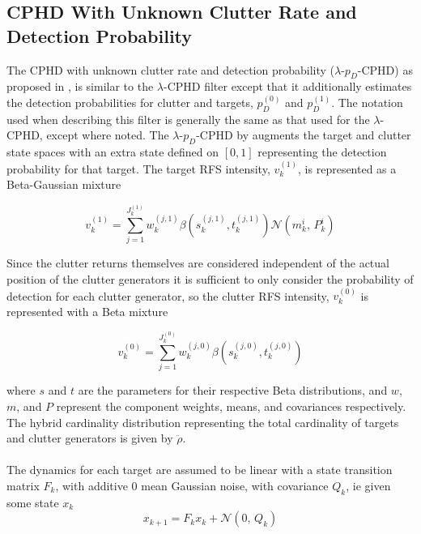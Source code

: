 \documentclass{article}
\newcommand{\clut}{{(0)}}
\newcommand{\tgt}{{(1)}}
\begin{document}
\subsection{CPHD With Unknown Clutter Rate and Detection Probability}
The CPHD with unknown clutter rate and detection probability ($\lambda$-$p_D$-CPHD) as proposed in \cite{cphd}, is similar to the $\lambda$-CPHD filter except that it additionally estimates the detection probabilities for clutter and targets, $p_D^{(0)}$ and $p_D^{(1)}$. The notation used when describing this filter is generally the same as that used for the $\lambda$-CPHD, except where noted. The $\lambda$-$p_D$-CPHD by augments the target and clutter state spaces with an extra state defined on $[0, 1]$ representing the detection probability for that target. The target RFS intensity, $v_k^{(1)}$, is represented as a Beta-Gaussian mixture

\begin{equation}
  \label{eq:v1_bm}
  v_k^\tgt = \sum_{j=1}^{J^\tgt _k}w_k^{(j,1)} \beta(s_k^{(j, 1)}, t_k^{(j, 1)})\mathcal{N}(m_k^i,\,P_k^i)
\end{equation}

Since the clutter returns themselves are considered independent of the actual position of the clutter generators it is sufficient to only consider the probability of detection for each clutter generator, so the clutter RFS intensity, $v_k^{(0)}$ is represented with a Beta mixture

\begin{equation}
  \label{eq:v0_bm}
  v_k^\clut = \sum_{j=1}^{J^\clut _k}w_k^{(j, 0)}\beta(s_k^{(j, 0)}, t_k^{(j, 0)})
\end{equation}

where $s$ and $t$ are the parameters for their respective Beta distributions, and $w$, $m$, and $P$ represent the component weights, means, and covariances respectively. The hybrid cardinality distribution representing the total cardinality of targets and clutter generators is given by $\ddot{\rho}$. \\
\\
The dynamics for each target are assumed to be linear with a state transition matrix $F_k$, with additive 0 mean Gaussian noise, with covariance $Q_k$, ie given some state $x_k$
\begin{equation}
  \label{eq:lpd_tgt_dynamics}
  x_{k+1} = F_kx_k + \mathcal{N}(0,\,Q_k)
\end{equation}
\end{document}
